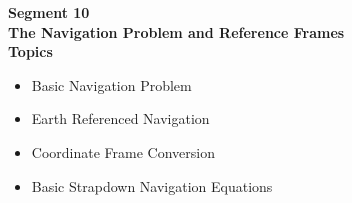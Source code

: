 \begin{frame}
\textbf{Segment 10\\
The Navigation Problem and Reference Frames\\
Topics}
 \begin{itemize}
 \item Basic Navigation Problem
 \item Earth Referenced Navigation
 \item Coordinate Frame Conversion
 \item Basic Strapdown Navigation Equations
\end{itemize}
\end{frame}





